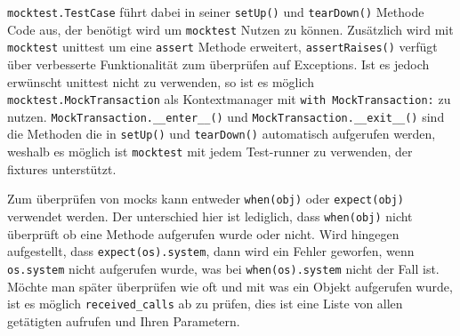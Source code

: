 \noindent
\lstinline{mocktest.TestCase} führt dabei in seiner \lstinline{setUp()} und
\lstinline{tearDown()} Methode Code aus, der benötigt wird um
\lstinline{mocktest} Nutzen zu können. Zusätzlich wird mit \lstinline{mocktest}
unittest um eine \lstinline{assert} Methode erweitert,
\lstinline{assertRaises()} verfügt über verbesserte Funktionalität zum
überprüfen auf Exceptions. Ist es jedoch erwünscht unittest nicht zu verwenden,
so ist es möglich \lstinline{mocktest.MockTransaction} als Kontextmanager mit
\lstinline{with MockTransaction:} zu nutzen.
\lstinline{MockTransaction.__enter__()} und
\lstinline{MockTransaction.__exit__()} sind die Methoden die in
\lstinline{setUp()} und \lstinline{tearDown()} automatisch aufgerufen werden,
weshalb es möglich ist \lstinline{mocktest} mit jedem Test-runner zu verwenden,
der \Glspl{fixture} unterstützt.
\newline

Zum überprüfen von \Glspl{mock} kann entweder \lstinline{when(obj)} oder
\lstinline{expect(obj)} verwendet werden. Der unterschied hier ist lediglich,
dass \lstinline{when(obj)} nicht überprüft ob eine Methode aufgerufen wurde oder
nicht. Wird hingegen aufgestellt, dass \lstinline{expect(os).system}, dann wird
ein Fehler geworfen, wenn \lstinline{os.system} nicht aufgerufen wurde, was bei
\lstinline{when(os).system} nicht der Fall ist. Möchte man später überprüfen wie
oft und mit was ein Objekt aufgerufen wurde, ist es möglich
\lstinline{received_calls} ab zu prüfen, dies ist eine Liste von allen
getätigten aufrufen und Ihren Parametern.
\newline

